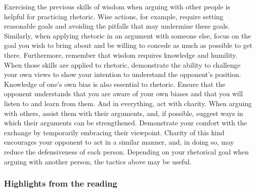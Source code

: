 \documentclass[
]{book}
\begin{document}
Exercising the previous skills of wisdom when arguing with other people is helpful for practicing rhetoric. Wise actions, for example, require setting reasonable goals and avoiding the pitfalls that may undermine these goals. Similarly, when applying rhetoric in an argument with someone else, focus on the goal you wish to bring about and be willing to concede as much as possible to get there. Furthermore, remember that wisdom requires knowledge and humility. When those skills are applied to rhetoric, demonstrate the ability to challenge your own views to show your intention to understand the opponent's position. Knowledge of one's own bias is also essential to rhetoric. Ensure that the opponent understands that you are aware of your own biases and that you will listen to and learn from them. And in everything, act with charity. When arguing with others, assist them with their arguments, and, if possible, suggest ways in which their arguments can be strengthened. Demonstrate your comfort with the exchange by temporarily embracing their viewpoint. Charity of this kind encourages your opponent to act in a similar manner, and, in doing so, may reduce the defensiveness of each person. Depending on your rhetorical goal when arguing with another person, the tactics above may be useful.

\hypertarget{highlights-from-the-reading-5}{%
\subsubsection*{Highlights from the reading}\label{highlights-from-the-reading-5}}
\end{document}
